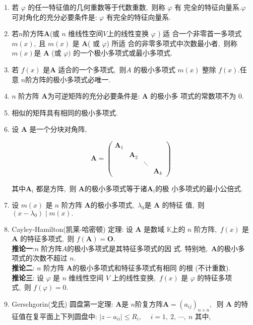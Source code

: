 \begin{enumerate}
		\item 若 $ \varphi $ 的任一特征值的几何重数等于代数重数,\  则称 $ \varphi $ 有 完全的特征向量系.$ \varphi  $可对角化的充分必要条件是: $ \varphi$  有完全的特征向量系.
		\item 若$  n  $阶方阵$  \boldsymbol{A}  $(或  $n$  维线性空间$  V  $上的线性变换 $ \varphi $ ) 适 合一个非零首一多项式  $m(x) ,\  $且 $ m(x) $ 是  $\boldsymbol{A}$(  或  $\varphi$)  所适 合的非零多项式中次数最小者,\  则称  $m(x)  $是 $ \boldsymbol{A} $ (或  $\varphi) $ 的一个极小多项式或最小多项式.
		\item 若 $ f(x) $ 是$  \boldsymbol{A} $ 适合的一个多项式,\  则$  A $ 的极小多项式 $ m(x)$  整除 $ f(x) . $任意 $ n  $阶方阵的极小多项式必唯一.
		\item  $n $ 阶方阵 $ \boldsymbol{A}  $为可逆矩阵的充分必要条件是:  $\boldsymbol{A} $ 的极小多 项式的常数项不为 $0 .$
		\item 相似的矩阵具有相同的极小多项式.
		\item 设 $ \boldsymbol{A} $ 是一个分块对角阵,\ 
		
		$$\boldsymbol{A}=\left(\begin{array}{llll}
			\boldsymbol{A}_{1} & & & \\
			& \boldsymbol{A}_{2} & & \\
			& & \ddots & \\
			& & & \boldsymbol{A}_{k}
		\end{array}\right)$$
		
		其中$  \boldsymbol{A}_{i}$  都是方阵,\  则 $ \boldsymbol{A}  $的极小多项式等于诸$  \boldsymbol{A}_{i}  $的极 小多项式的最小公倍式.
		\item 设  $m(x) $ 是  $n $ 阶方阵  $\boldsymbol{A}  $的极小多项式,\   $\lambda_{0}  $是 $ \boldsymbol{A}$  的特征 值,\  则  $\left(x-\lambda_{0}\right) \mid m(x) .$
		\item Cayley-Hamilton(凯莱-哈密顿) 定理: 设 $ \boldsymbol{A} $ 是数域 $ \mathbb{K}  $上的 $ n$  阶方阵,\  $ f(x) $ 是$ \boldsymbol{A} $ 的特征多项式,\  则  $f(\boldsymbol{A})=\boldsymbol{O} . $\\
		\textbf{推论一}:$  n $ 阶方阵$  A  $的极小多项式是其特征多项式的因 式. 特别地,\   $\boldsymbol{A}  $的极小多项式的次数不超过 $ n .$\\
		\textbf{推论二}:  $n $ 阶方阵 $\boldsymbol{A}  $的极小多项式和特征多项式有相同 的根 (不计重数).\\
		\textbf{推论三}: 设 $ \varphi $ 是 $ n $ 维线性空间 $ V$  上的线性变换,\  $ f(x) $ 是  $\varphi $ 的特征多项式,\  则 $ f(\varphi)=0 .$
		\item Gerschgorin(戈氏) 圆盘第一定理: $ \boldsymbol{A}  $是  $n  $阶复方阵$  \boldsymbol{A}=\left(a_{i j}\right)_{n \times n} ,\ $ 则  $\boldsymbol{A} $ 的特征值在复平面上下列圆盘中: $ \left|z-a_{i i}\right| \leqslant R_{i},\  \quad i=1,\ 2,\  \cdots,\  n $
		其中,\ 
		

\end{enumerate}
